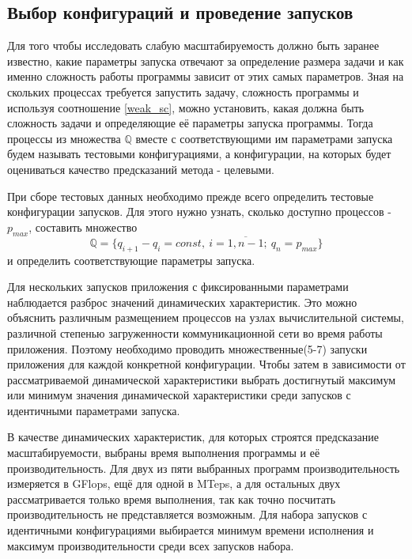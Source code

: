 	\subsection{Выбор конфигураций и проведение запусков}
		Для того чтобы исследовать слабую масштабируемость должно быть заранее известно, какие параметры запуска отвечают за определение размера задачи и как именно сложность работы программы зависит от этих самых параметров. Зная на скольких процессах требуется запустить задачу, сложность программы и используя соотношение \eqref{weak_sc}, можно установить, какая должна быть сложность задачи и определяющие её параметры запуска программы. Тогда процессы из множества \(\mathbb{Q}\) вместе с соответствующими им параметрами запуска будем называть тестовыми конфигурациями, а конфигурации, на которых будет оцениваться качество предсказаний метода - целевыми.

		При сборе тестовых данных необходимо прежде всего определить тестовые конфигурации запусков. Для этого нужно узнать, сколько доступно процессов - \(p_{max}\), составить множество \[\mathbb{Q} = \{q_{i + 1} - q_{i} = const,\ i = \overline{1,n - 1};\ q_n = p_{max}\}\] и определить соответствующие параметры запуска.


		Для нескольких запусков приложения с фиксированными параметрами наблюдается разброс значений динамических характеристик. Это можно объяснить различным размещением процессов на узлах вычислительной системы, различной степенью загруженности коммуникационной сети во время работы приложения. Поэтому необходимо проводить множественные(5-7) запуски приложения для каждой конкретной конфигурации. Чтобы затем в зависимости от рассматриваемой динамической характеристики выбрать достигнутый максимум или минимум значения динамической характеристики среди запусков с идентичными параметрами запуска.

		В качестве динамических характеристик, для которых строятся предсказание масштабируемости, выбраны время выполнения программы и её производительность. Для двух из пяти выбранных программ производительность измеряется в GFlops, ещё для одной в MTeps, а для остальных двух рассматривается только время выполнения, так как точно посчитать производительность не представляется возможным. Для набора запусков с идентичными конфигурациями выбирается минимум времени исполнения и максимум производительности среди всех запусков набора.

